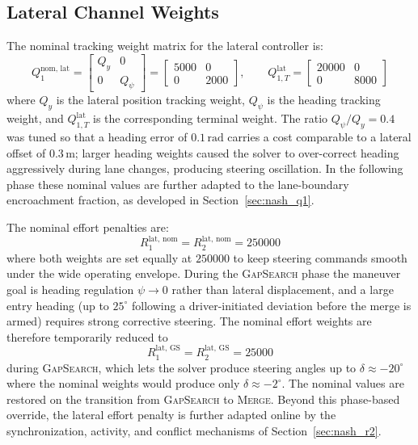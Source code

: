 \documentclass[12pt,a4paper,oneside]{report}
\begin{document}
\subsection{Lateral Channel Weights}
\label{sec:lat_weights}

The nominal tracking weight matrix for the lateral controller is:
\begin{equation}
Q_1^{\text{nom, lat}} = \begin{bmatrix} Q_y & 0 \\ 0 & Q_\psi \end{bmatrix} = \begin{bmatrix} 5000 & 0 \\ 0 & 2000 \end{bmatrix}, \qquad
Q_{1,T}^{\text{lat}} = \begin{bmatrix} 20000 & 0 \\ 0 & 8000 \end{bmatrix}
\label{eq:Q1_lat}
\end{equation}
where $Q_y$ is the lateral position tracking weight, $Q_\psi$ is the heading tracking weight, and $Q_{1,T}^{\text{lat}}$ is the corresponding terminal weight. The ratio $Q_\psi / Q_y = 0.4$ was tuned so that a heading error of $0.1\,\mathrm{rad}$ carries a cost comparable to a lateral offset of $0.3\,\mathrm{m}$; larger heading weights caused the solver to over-correct heading aggressively during lane changes, producing steering oscillation. In the following phase these nominal values are further adapted to the lane-boundary encroachment fraction, as developed in Section~\ref{sec:nash_q1}.

The nominal effort penalties are:
\begin{equation}
R_1^{\text{lat, nom}} = R_2^{\text{lat, nom}} = 250000
\label{eq:R_lat_nominal}
\end{equation}
where both weights are set equally at $250000$ to keep steering commands smooth under the wide operating envelope. During the \textsc{GapSearch} phase the maneuver goal is heading regulation $\psi \to 0$ rather than lateral displacement, and a large entry heading (up to $25^\circ$ following a driver-initiated deviation before the merge is armed) requires strong corrective steering. The nominal effort weights are therefore temporarily reduced to
\begin{equation}
R_1^{\text{lat, GS}} = R_2^{\text{lat, GS}} = 25000
\label{eq:R_lat_gs}
\end{equation}
during \textsc{GapSearch}, which lets the solver produce steering angles up to $\delta \approx -20^\circ$ where the nominal weights would produce only $\delta \approx -2^\circ$. The nominal values are restored on the transition from \textsc{GapSearch} to \textsc{Merge}. Beyond this phase-based override, the lateral effort penalty is further adapted online by the synchronization, activity, and conflict mechanisms of Section~\ref{sec:nash_r2}.
\end{document}
